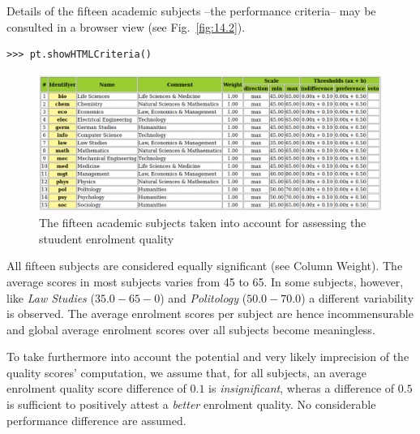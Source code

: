 Details of the fifteen academic subjects --the performance criteria-- may be consulted in a browser view (see Fig.~\vref{fig:14.2}).
\begin{lstlisting}
>>> pt.showHTMLCriteria()
\end{lstlisting}
\begin{figure}[ht]
\includegraphics[width=\hsize]{Figures/14-2-spiegelCriteria.png}
\caption{The fifteen academic subjects taken into account for assessing the stuudent enrolment quality}
\label{fig:14.2}       %
\end{figure}

All fifteen subjects are considered equally significant (see Column Weight). The average scores in most subjects varies from 45 to 65. In some subjects, however, like \emph{Law Studies} ($35.0 - 65-0$) and \emph{Politology} ($50.0 - 70.0$) a different variability is observed. The average enrolment scores per subject are hence incommensurable and global average enrolment scores over all subjects become meaningless. 

To take furthermore into account the potential and very likely imprecision of the quality scores' computation, we assume that, for all subjects, an average enrolment quality score difference of $0.1$ is \emph{insignificant}, wheras a difference of $0.5$ is sufficient to positively attest a \emph{better} enrolment quality. No considerable performance difference are assumed.

